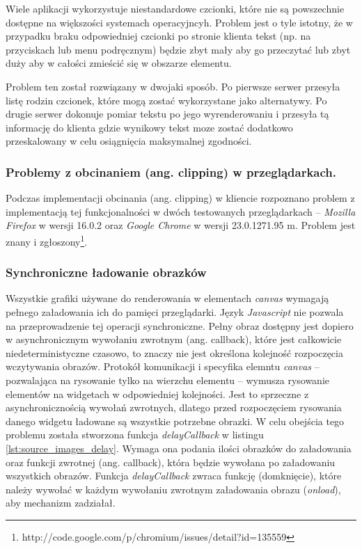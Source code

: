 Wiele aplikacji wykorzystuje niestandardowe czcionki, które nie są powszechnie dostępne na większości systemach operacyjncyh. Problem jest o tyle istotny, że w przypadku braku odpowiedniej czcionki po stronie klienta tekst (np. na przyciskach lub menu podręcznym) będzie zbyt mały aby go przeczytać lub zbyt duży aby w całości zmieścić się w obszarze elementu. 

Problem ten został rozwiązany w dwojaki sposób. Po pierwsze serwer przesyła listę rodzin czcionek, które mogą zostać wykorzystane jako alternatywy. Po drugie serwer dokonuje pomiar tekstu po jego wyrenderowaniu i przesyła tą informację do klienta gdzie wynikowy tekst moze zostać dodatkowo przeskalowany w celu osiągnięcia maksymalnej zgodności.

\subsubsection{Problemy z obcinaniem (ang. clipping) w przeglądarkach.}
\label{problems_clipping}
Podczas implementacji obcinania (ang. clipping) w kliencie rozpoznano problem z implementacją tej funkcjonalności w dwóch testowanych przeglądarkach -- \emph{Mozilla Firefox} w wersji 16.0.2 oraz \emph{Google Chrome} w wersji 23.0.1271.95 m. Problem jest znany i zgłoszony\footnote{http://code.google.com/p/chromium/issues/detail?id=135559}.

\subsubsection{Synchroniczne ładowanie obrazków}

Wszystkie grafiki używane do renderowania w elementach \emph{canvas} wymagają pełnego załadowania ich do pamięci przeglądarki. Język \emph{Javascript} nie pozwala na przeprowadzenie tej operacji synchroniczne. Pełny obraz dostępny jest dopiero w asynchronicznym wywołaniu zwrotnym (ang. callback), które jest całkowicie niedeterministyczne czasowo, to znaczy nie jest określona kolejność rozpoczęcia wczytywania obrazów. Protokół komunikacji i specyfika elemntu \emph{canvas} -- pozwalająca na rysowanie tylko na wierzchu elementu -- wymusza rysowanie elementów na widgetach w odpowiedniej kolejności. Jest to sprzeczne z asynchronicznością wywołań zwrotnych, dlatego przed rozpoczęciem rysowania danego widgetu ładowane są wszystkie potrzebne obrazki. W celu obejścia tego problemu została stworzona funkcja \emph{delayCallback} w listingu \ref{lst:source_images_delay}. Wymaga ona podania ilości obrazków do załadowania oraz funkcji zwrotnej (ang. callback), która będzie wywołana po załadowaniu wszystkich obrazów. Funkcja \emph{delayCallback} zwraca funkcję (domknięcie), które należy wywołać w każdym wywołaniu zwrotnym załadowania obrazu (\emph{onload}), aby mechanizm zadziałał.

